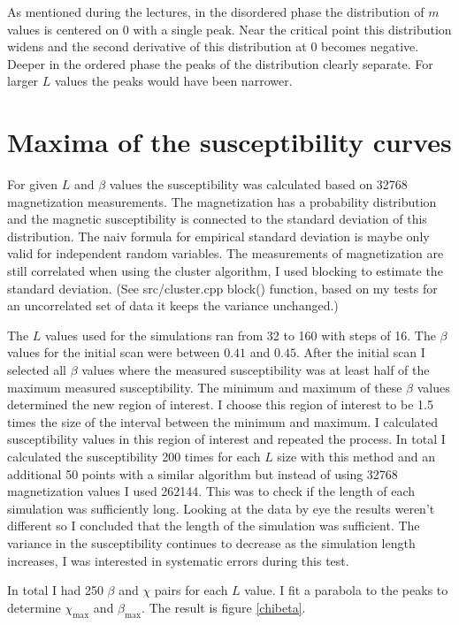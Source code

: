 \documentclass[pdftex,12pt,a4paper]{article}
\begin{document}
As mentioned during the lectures, in the disordered phase the distribution of $m$ values is centered on 0 with a single peak. Near the critical point this distribution widens and the second derivative of this distribution at 0 becomes negative. Deeper in the ordered phase the peaks of the distribution clearly separate. For larger $L$ values the peaks would have been narrower.

\section{Maxima of the susceptibility curves}

For given $L$ and $\beta$ values the susceptibility was calculated based on 32768 magnetization measurements. The magnetization has a probability distribution and the magnetic susceptibility is connected to the standard deviation of this distribution. The naiv formula for empirical standard deviation is maybe only valid for independent random variables. The measurements of magnetization are still correlated when using the cluster algorithm, I used blocking to estimate the standard deviation. (See src/cluster.cpp block() function, based on my tests for an uncorrelated set of data it keeps the variance unchanged.) 

The $L$ values used for the simulations ran from 32 to 160 with steps of 16. The $\beta$ values for the initial scan were between $0.41$ and $0.45$. After the initial scan I selected all $\beta$ values where the measured susceptibility was at least half of the maximum measured susceptibility. The minimum and maximum of these $\beta$ values determined the new region of interest. I choose this region of interest to be 1.5 times the size of the interval between the minimum and maximum. I calculated susceptibility values in this region of interest and repeated the process. In total I calculated the susceptibility 200 times for each $L$ size with this method and an additional 50 points with a similar algorithm but instead of using 32768 magnetization values I used 262144. This was to check if the length of each simulation was sufficiently long. Looking at the data by eye the results weren't different so I concluded that the length of the simulation was sufficient. The variance in the susceptibility continues to decrease as the simulation length increases, I was interested in systematic errors during this test.

In total I had 250 $\beta$ and $\chi$ pairs for each $L$ value. I fit a parabola to the peaks to determine $\chi_{\mathrm{max}}$ and $\beta_{\mathrm{max}}$. The result is figure \ref{chibeta}.
\end{document}
